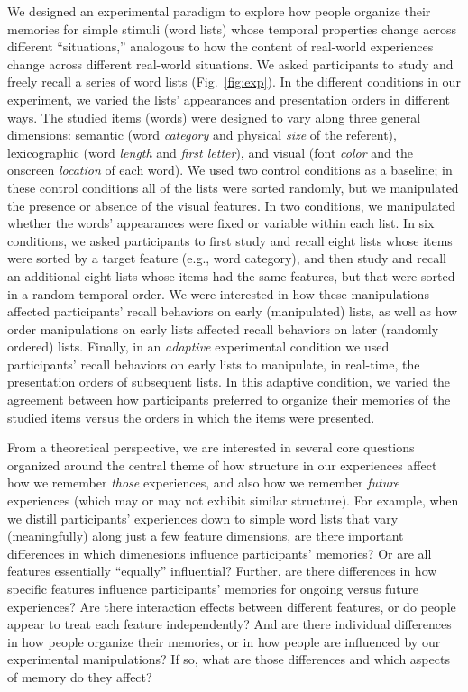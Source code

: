 \documentclass[11pt]{article}
\begin{document}
We designed an experimental paradigm to explore how people organize their
memories for simple stimuli (word lists) whose temporal properties change
across different ``situations,'' analogous to how the content of real-world
experiences change across different real-world situations. We asked
participants to study and freely recall a series of word lists
(Fig.~\ref{fig:exp}). In the different conditions in our experiment, we varied
the lists' appearances and presentation orders in different ways. The studied
items (words) were designed to vary along three general dimensions: semantic
(word \textit{category} and physical \textit{size} of the referent),
lexicographic (word \textit{length} and \textit{first letter}), and visual
(font \textit{color} and the onscreen \textit{location} of each word). We used
two control conditions as a baseline; in these control conditions all of the
lists were sorted randomly, but we manipulated the presence or absence of the
visual features. In two conditions, we manipulated whether the words'
appearances were fixed or variable within each list. In six conditions, we
asked participants to first study and recall eight lists whose items were
sorted by a target feature (e.g., word category), and then study and recall an
additional eight lists whose items had the same features, but that were sorted
in a random temporal order. We were interested in how these manipulations
affected participants' recall behaviors on early (manipulated) lists, as well
as how order manipulations on early lists affected recall behaviors on later
(randomly ordered) lists. Finally, in an \textit{adaptive} experimental
condition we used participants' recall behaviors on early lists to manipulate,
in real-time, the presentation orders of subsequent lists. In this adaptive
condition, we varied the agreement between how participants preferred to
organize their memories of the studied items versus the orders in which the
items were presented.


From a theoretical perspective, we are interested in several core questions
organized around the central theme of how structure in our experiences affect
how we remember \textit{those} experiences, and also how we remember
\textit{future} experiences (which may or may not exhibit similar structure).
For example, when we distill participants' experiences down to simple word
lists that vary (meaningfully) along just a few feature dimensions, are there
important differences in which dimenesions influence participants' memories? Or
are all features essentially ``equally'' influential? Further, are there
differences in how specific features influence participants' memories for
ongoing versus future experiences? Are there interaction effects between
different features, or do people appear to treat each feature independently?
And are there individual differences in how people organize their
memories, or in how people are influenced by our experimental manipulations? If
so, what are those differences and which aspects of memory do they affect?
\end{document}

